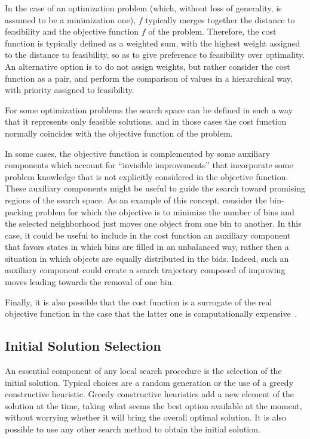 In the case of an optimization problem (which, without loss of
generality, is assumed to be a minimization one), $f$ typically merges
together the distance to feasibility and the objective function $f$ of
the problem.  Therefore, the cost function is typically defined as a
weighted sum, with the highest weight assigned to the distance to
feasibility, so as to give preference to feasibility over
optimality. %
%
An alternative option is to do not assign weights, but rather consider
the cost function as a pair, and perform the comparison of values in a
hierarchical way, with priority assigned to feasibility.

For some optimization problems the search space can be defined in such
a way that it represents only feasible solutions, and in those cases the cost
function normally coincides with the objective function of the problem.

In some cases, the objective function is complemented by some
auxiliary components which account for ``invisible improvements'' that
incorporate some problem knowledge that is not explicitly considered
in the objective function.  These auxiliary components might be useful
to guide the search toward promising regions of the search space.
As an example of this concept, consider the bin-packing problem for
which the objective is to minimize the number of bins and the selected
neighborhood just moves one object from one bin to another. In this
case, it could be useful to include in the cost function an auxiliary
component that favors states in which bins are filled in an unbalanced
way, rather then a situation in which objects are equally distributed
in the bids. Indeed, such an auxiliary component could create a search
trajectory composed of improving moves leading towards the removal of
one bin. %

Finally, it is also possible that the cost function is a surrogate of
the real objective function in the case that the latter one is
computationally expensive~\cite{KoCL11}.

\subsection{Initial Solution Selection}

An essential component of any local search procedure is the selection of
the initial solution. Typical choices are a random
generation or the use of a greedy constructive heuristic. 
Greedy constructive heuristics add a new element of the solution at the time, taking what seems the best option available at the moment, without worrying whether it will bring the overall optimal solution. It is also possible to use any
other search method to obtain the initial solution.

